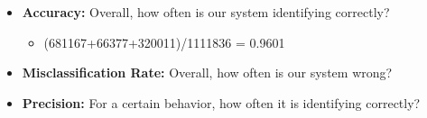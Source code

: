 \begin{itemize}
	\item \textbf{Accuracy:} Overall, how often is our system identifying correctly?
	\begin{itemize}
		
		\item (681167+66377+320011)/1111836 = 0.9601
		
	\end{itemize}
	
	\item \textbf{Misclassification Rate:} Overall, how often is our system wrong?
	
	
	\item \textbf{Precision:} For a certain behavior, how often it is identifying correctly?

	
\end{itemize}